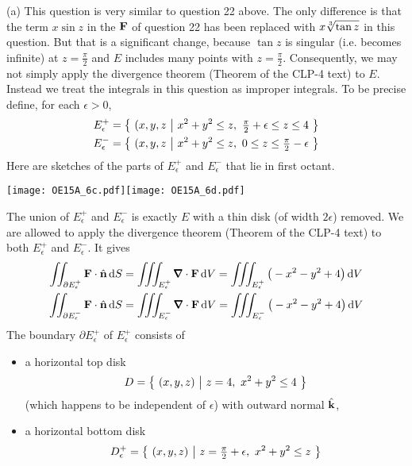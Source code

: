 \begin{solution} (a) This question is very similar to question 22 above. 
The only difference is that the term $x\sin z$ in the $\mathbf{F}$ of question 22
has been replaced with $x\root{3}\of{\tan z}$ in this question. But that is a significant 
change, because $\tan z$ is singular (i.e. becomes infinite) at $z=\tfrac{\pi}{2}$
and $E$ includes many points with $z=\tfrac{\pi}{2}$. Consequently, we may not
simply apply the divergence theorem (Theorem  of the 
CLP-4 text) to $E$. Instead we treat the integrals in this question as improper 
integrals. To be precise define, for each $\epsilon>0$,
\begin{align*}
E_\epsilon^+ &= \Set{(x,y,z}{x^2+y^2\le z,\ \tfrac{\pi}{2}+\epsilon\le z\le 4} \\
E_\epsilon^- &= \Set{(x,y,z}{x^2+y^2\le z,\ 0\le z \le \tfrac{\pi}{2}-\epsilon} 
\end{align*} 
Here are sketches of the parts of $E_\epsilon^+$ and $E_\epsilon^-$ that lie in first octant.
 \begin{center}
    \texttt{[image: OE15A\_6c.pdf]}\quad \texttt{[image: OE15A\_6d.pdf]}
\end{center}
The union of $E_\epsilon^+$ and $E_\epsilon^-$ is exactly $E$ with a thin disk
(of width $2\epsilon$) removed. We are allowed to apply the  divergence theorem 
(Theorem  of the CLP-4 text) to both $E_\epsilon^+$ and $E_\epsilon^-$.
It gives  
\begin{align*}
\dblInt_{\partial E_\epsilon^+}\vF\cdot\hn\,\dee{S}
&=\tripInt_{E_\epsilon^+} \vnabla\cdot\vF\,\dee{V} 
 =\tripInt_{E_\epsilon^+} \big(-x^2-y^2+4\big)\,\dee{V} \\
\dblInt_{\partial E_\epsilon^-}\vF\cdot\hn\,\dee{S}
&=\tripInt_{E_\epsilon^-} \vnabla\cdot\vF\,\dee{V} 
 =\tripInt_{E_\epsilon^-} \big(-x^2-y^2+4\big)\,\dee{V} 
\end{align*}
The boundary $\partial E_\epsilon^+$ of $E_\epsilon^+$ consists of
\begin{itemize}\itemsep1pt \parskip0pt  %
\item a horizontal top disk 
\begin{equation*}
   D =\big\{ \ (x,y,z)\ \big|\ z=4,\ x^2+y^2\le 4\ \big\}
\end{equation*}
(which happens to be independent of $\epsilon$) with outward normal $\hat{\mathbf{k}}$,
\item a horizontal bottom disk
\begin{equation*}
   D_{\epsilon}^+ =\Set{(x,y,z)}{z=\tfrac{\pi}{2}+\epsilon,\ x^2+y^2\le z}

\end{equation*}
\end{itemize}
\end{solution}
